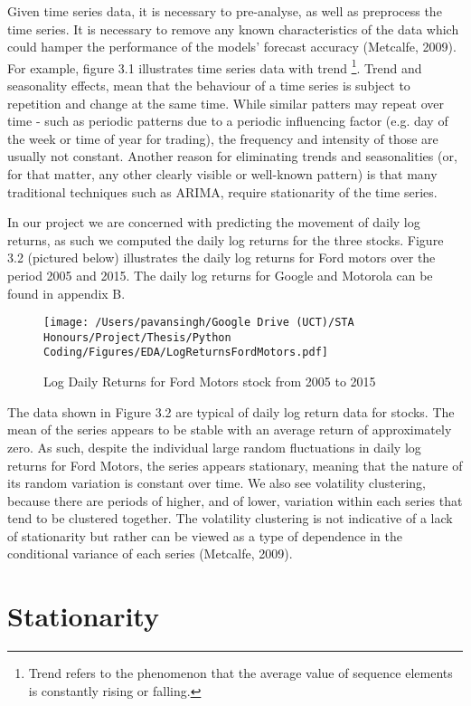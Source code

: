 Given time series data, it is necessary to pre-analyse, as well as preprocess the time series. It is necessary to remove any known characteristics of the data which could hamper the performance of the models' forecast accuracy (Metcalfe, 2009). For example, figure 3.1 illustrates time series data with trend \footnote{Trend refers to the phenomenon that the average value of sequence elements is constantly rising or falling.}. Trend and seasonality effects, mean that the behaviour of a time series is subject to repetition and change at the same time. While similar patters may repeat over time - such as periodic patterns due to a periodic influencing factor (e.g. day of the week or time of year for trading), the frequency and intensity of those are usually not constant. Another reason for eliminating trends and seasonalities (or, for that matter, any other clearly visible or well-known pattern) is that many traditional techniques such as ARIMA, require stationarity of the time series. 

In our project we are concerned with predicting the movement of daily log returns, as such we computed the daily log returns for the three stocks. Figure 3.2 (pictured below) illustrates the daily log returns for Ford motors over the period 2005 and 2015. The daily log returns for Google and Motorola can be found in appendix B.

\begin{figure}[h]
\centering
  \texttt{[image: /Users/pavansingh/Google Drive (UCT)/STA Honours/Project/Thesis/Python Coding/Figures/EDA/LogReturnsFordMotors.pdf]}
  \caption{Log Daily Returns for Ford Motors stock from 2005 to 2015}
  \label{}
\end{figure}

The data shown in Figure 3.2 are typical of daily log return data for stocks. The mean of the series appears to be stable with an average return of approximately zero. As such, despite the individual large random fluctuations in daily log returns for Ford Motors, the series appears stationary, meaning that the nature of its random variation is constant over time. We also see volatility clustering, because there are periods of higher, and of lower, variation within each series that tend to be clustered together. The volatility clustering is not indicative of a lack of stationarity but rather can be viewed as a type of dependence in the conditional variance of each series (Metcalfe, 2009). 

\section{Stationarity}

